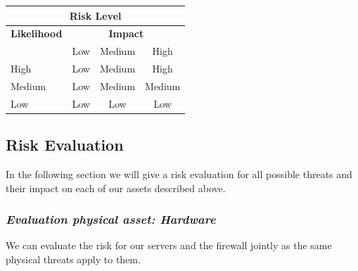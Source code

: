 \documentclass[english]{article}
\begin{document}
\vspace{5mm}

\begin{center}
\begin{tabular}{|l|c|c|c|}
\hline
\multicolumn{4}{|c|}{{\bf Risk Level}} \\
\hline
{{\bf Likelihood}} & \multicolumn{3}{c|}{{\bf Impact}} \\ \cline{2-4}
     & Low & Medium & High \\  \hline
 High & Low & Medium & High  \\
\hline
 Medium & Low & Medium & Medium \\
\hline
 Low & Low & Low & Low \\
\hline
\end{tabular}
\end{center}


\subsection{Risk Evaluation}



In the following section we will give a risk evaluation for all possible threats and their impact on each of our assets described above. 


\subsubsection{{\it Evaluation physical asset: Hardware}}




We can evaluate the risk for our servers and the firewall jointly as the same physical threats apply to them.
\end{document}
